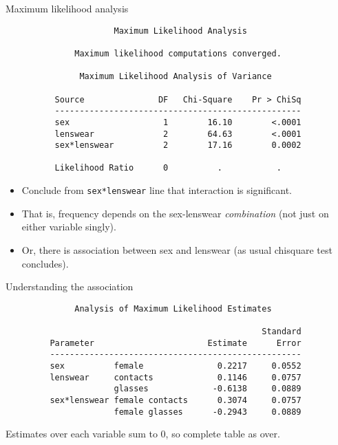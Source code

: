 \documentclass[pdf]{prosper}
\begin{document}
\begin{slide}{Maximum likelihood analysis}

{\scriptsize
\begin{verbatim}
                      Maximum Likelihood Analysis

              Maximum likelihood computations converged.           

               Maximum Likelihood Analysis of Variance
 
          Source               DF   Chi-Square    Pr > ChiSq
          --------------------------------------------------
          sex                   1        16.10        <.0001
          lenswear              2        64.63        <.0001
          sex*lenswear          2        17.16        0.0002

          Likelihood Ratio      0          .           .    

\end{verbatim}
}

\begin{itemize}
\item Conclude from \verb-sex*lenswear- line that interaction is significant.
\item That is, frequency depends on the sex-lenswear {\em combination} (not just on either variable singly).
\item Or, there is association between sex and lenswear (as usual chisquare test concludes).
\end{itemize}
  
\end{slide}

\begin{slide}{Understanding the association}

{\scriptsize
\begin{verbatim}
              Analysis of Maximum Likelihood Estimates
 
                                                    Standard
         Parameter                       Estimate      Error
         ---------------------------------------------------
         sex          female               0.2217     0.0552
         lenswear     contacts             0.1146     0.0757
                      glasses             -0.6138     0.0889
         sex*lenswear female contacts      0.3074     0.0757
                      female glasses      -0.2943     0.0889

\end{verbatim}
}

Estimates over each variable sum to 0, so complete table as over.
  
\end{slide}
\end{document}
